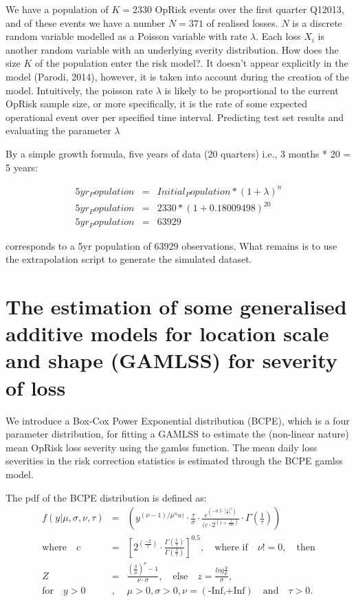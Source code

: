 \documentclass{DissertateUSU}
\begin{document}
We have a population of \(K = 2330\) OpRisk events over the first
quarter Q12013, and of these events we have a number \(N = 371\) of
realised losses. \(N\) is a discrete random variable modelled as a
Poisson variable with rate \(\lambda\). Each loss \(X_i\) is another
random variable with an underlying sverity distribution. How does the
size \(K\) of the population enter the risk model?. It doesn't appear
explicitly in the model (Parodi, 2014), however, it is taken into
account during the creation of the model. Intuitively, the poisson rate
\(\lambda\) is likely to be proportional to the current OpRisk sample
size, or more specifically, it is the rate of some expected operational
event over per specified time interval. Predicting test set results and
evaluating the parameter \(\lambda\)

By a simple growth formula, five years of data (20 quarters) i.e., 3
months * 20 = 5 years:

\singlespacing

\begin{eqnarray}
5yr_Population &=& Initial_Population * (1 + \lambda)^n \nonumber \\
5yr_Population &=& 2330*(1+0.18009498)^20 \nonumber \\
5yr_Population &=& 63929
\end{eqnarray} \doublespacing

corresponds to a 5yr population of \(63929\) observations. What remains
is to use the extrapolation script to generate the simulated dataset.

\section{The estimation of some  generalised additive models for location scale and shape (GAMLSS) for severity of loss}
\label{sec:The estimation of some  generalised additive models for location scale and shape (GAMLSS) for severity of loss}

We introduce a Box-Cox Power Exponential distribution (BCPE), which is a
four parameter distribution, for fitting a GAMLSS to estimate the
(non-linear nature) mean OpRisk loss severity using the gamlss function.
The mean daily loss severities in the risk correction statistics is
estimated through the BCPE gamlss model.\medskip

The pdf of the BCPE distribution is defined as: \singlespacing
\begin{eqnarray}
f(y|\mu,\sigma,\nu,\tau)&=&(y^{(\nu-1)/\mu^nu)}\cdot{\frac{\tau}{\sigma}}\cdot \frac{e^(-0.5\cdot|\frac{z}{c}|^\tau)}{(c\cdot 2^(1+\frac{1}{tau})}\cdot \Gamma(\frac{1}{\tau}))\nonumber\\
\mbox{where} \quad c&=&[2^(\frac{-2}{\tau})\cdot\frac{\Gamma(\frac{1}{\tau})}{\Gamma(\frac{3}{\tau})}]^{0.5},\quad \mbox{where if}\quad \nu!=0, \quad \mbox{then} \nonumber\\
Z&=&\frac{(\frac{y}{\mu})^\nu-1}{\nu\cdot \sigma},\quad \mbox{else} \quad z=\frac{log\frac{y}{\mu}}{\sigma},\nonumber\\
\mbox{for} \quad y>0 &,& \mu>0, \sigma>0, \nu=(\mbox{-Inf,+Inf})\quad \mbox{and}\quad \tau>0.
\end{eqnarray} \doublespacing
\end{document}
